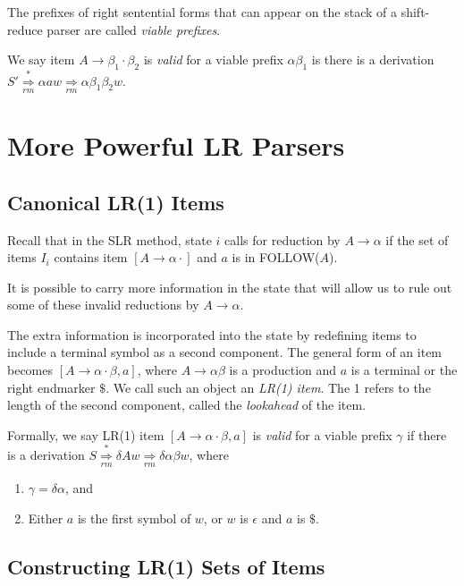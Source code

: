 \documentclass[12pt,a4paper,twoside,openany]{book}
\begin{document}
The prefixes of right sentential forms that can appear on the stack of a shift-reduce parser are called \textit{viable prefixes}.

We say item $A\rightarrow\beta_1\cdot\beta_2$ is \textit{valid} for a viable prefix $\alpha\beta_1$ is there is a derivation $S'\underset{rm}{\overset{*}{\Rightarrow}}\alpha aw\underset{rm}{\Rightarrow}\alpha\beta_1\beta_2w$.

\section{More Powerful LR Parsers}
\subsection{Canonical LR(1) Items}

Recall that in the SLR method, state $i$ calls for reduction by $A\rightarrow\alpha$ if the set of items $I_i$ contains item $[A\rightarrow\alpha\cdot]$ and $a$ is in FOLLOW($A$).

It is possible to carry more information in the state that will allow us to rule out some of these invalid reductions by $A\rightarrow\alpha$.

The extra information is incorporated into the state by redefining items to include a terminal symbol as a second component. The general form of an item becomes $[A\rightarrow\alpha\cdot\beta,a]$, where $A\rightarrow\alpha\beta$ is a production and $a$ is a terminal or the right endmarker $\$$. We call such an object an \textit{LR(1) item}. The 1 refers to the length of the second component, called the \textit{lookahead} of the item.

Formally, we say LR(1) item $[A\rightarrow\alpha\cdot\beta,a]$ is \textit{valid} for a viable prefix $\gamma$ if there is a derivation $S\underset{rm}{\overset{*}{\Rightarrow}}\delta Aw\underset{rm}{\Rightarrow}\delta\alpha\beta w$, where
\begin{enumerate}
    \item $\gamma=\delta\alpha$, and
    \item Either $a$ is the first symbol of $w$, or $w$ is $\epsilon$ and $a$ is $\$$.
\end{enumerate}

\subsection{Constructing LR(1) Sets of Items}

\end{document}
